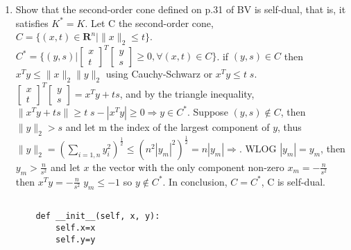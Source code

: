 \documentclass[10pt]{article}
\newcommand{\0}{\mat{0}}
\begin{document}
\begin{enumerate}
\item Show that the second-order cone defined on p.31 of BV is self-dual, that is, it satisfies $K^* = K$.
Let C the second-order cone, $C=\{(x, t) \in  \mathbf{R}^n | \| x \|_2 \le t \}$. $C^* = \{(y,s) | \begin{bmatrix} x \\ t  \end{bmatrix}^T \begin{bmatrix} y \\ s  \end{bmatrix} \ge 0, \forall (x,t) \in C\}$.
if $(y, s) \in C$ then $x^T y \le \| x \|_2 \| y \|_2$ using Cauchy-Schwarz or  $x^T y \le t \; s$. 
$\begin{bmatrix} x \\ t  \end{bmatrix}^T \begin{bmatrix} y \\ s  \end{bmatrix}  = x^T y + ts$, and by the triangle inequality, $\|x^T y + ts\|  \ge t \; s - | x^T y | \ge 0 \Rightarrow y \in C^*$.
Suppose $(y, s) \notin C$, then $\| y \|_2 > s$ and let m the index of the largest component of $y$, 
thus $\| y \|_2 = (\sum_{i=1,n} y_i^2)^{\frac{1}{2}} \le (n^2 |y_m|^2)^{\frac{1}{2}} = n |y_m| \Rightarrow $. WLOG $| y_m | = y_m$, then $y_m > \frac{n} {s^2}$
and let $x$ the vector with the only component non-zero $x_m = - \frac{n} {s^2}$ then $x^T y = - \frac{n} {s^2} \; y_m \le - 1$ so $y \notin C^*$.
In conclusion, $C = C^*$, C is self-dual.
 
\begin{verbatim}

    def __init__(self, x, y): 
        self.x=x
        self.y=y

\end{verbatim}
 
\end{enumerate}
\end{document}
